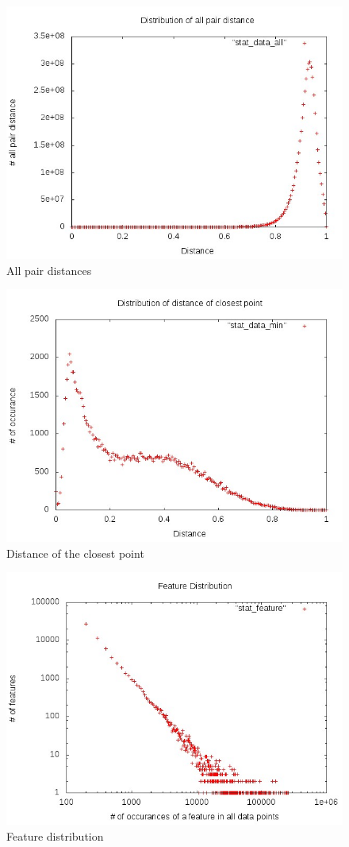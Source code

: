 \begin{figure}[ht!]	
\centering
\includegraphics[width=0.7 \columnwidth]{img/all.jpg}
\caption{All pair distances}
\end{figure}
\begin{figure}[ht!]	
\centering
\includegraphics[width=0.7 \columnwidth]{img/min.jpg}
\caption{Distance of the closest point}
\end{figure}

\begin{figure}[ht!]	
\centering
\includegraphics[width=0.7 \columnwidth]{img/feature.jpg}
\caption{Feature distribution}
\end{figure}


